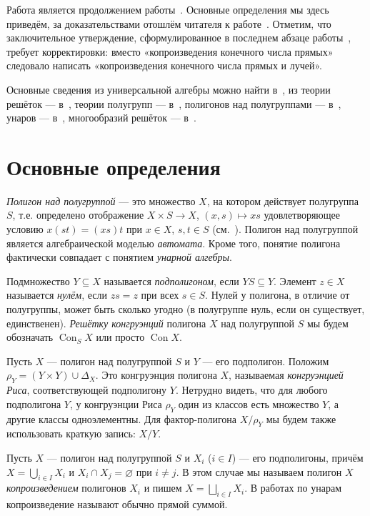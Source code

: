 \documentclass[11pt,twoside,final
]{article}
\def\Con{\operatorname{Con}}
\begin{document}
Работа является продолжением работы~\cite{Kozhukhov_8}.
Основные определения мы здесь приведём, за доказательствами отошлём читателя к работе~\cite{Kozhukhov_8}.
Отметим, что заключительное утверждение, сформулированное в последнем абзаце работы~\cite{Kozhukhov_8}, требует корректировки: вместо «копроизведения конечного числа прямых» следовало написать «копроизведения конечного числа прямых и лучей».

Основные сведения из универсальной алгебры можно найти в~\cite{Kohn_9}, из теории решёток — в~\cite{Gretzer_10}, теории полугрупп — в~\cite{Clifford_11}, полигонов над полугруппами — в~\cite{Kilp_1}, унаров — в~\cite{Jakubikova_12}, многообразий решёток — в~\cite{Jipsen_13}.


\section{Основные определения}

\textit{Полигон над полугруппой} — это множество $X$, на котором действует полугруппа $S$, т.е. определено отображение $X \times S \to X$, $(x,s) \mapsto xs$ удовлетворяющее условию $x(st) = (xs)t$ при $x \in X$, $s,t \in S$ (см.~\cite{Kilp_1}).
Полигон над полугруппой является алгебраической моделью \textit{автомата}.
Кроме того, понятие полигона фактически совпадает с понятием \textit{унарной алгебры}.

Подмножество $Y \subseteq X$ называется \textit{подполигоном}, если $YS \subseteq Y$.
Элемент $z \in X$ называется \textit{нулём}, если $zs = z$ при всех $s \in S$.
Нулей у полигона, в отличие от полугруппы, может быть сколько угодно (в полугруппе нуль, если он существует, единственен).
\textit{Решётку конгруэнций} полигона $X$ над полугруппой $S$ мы будем обозначать $\Con_S X$ или просто $\Con X$.

Пусть $X$ — полигон над полугруппой $S$ и $Y$ — его подполигон.
Положим $ \rho_Y = (Y \times Y) \cup \Delta_X $.
Это конгруэнция полигона $X$, называемая \textit{конгруэнцией Риса}, соответствующей подполигону $Y$.
Нетрудно видеть, что для любого подполигона $Y$, у конгруэнции Риса $\rho_Y$ один из классов есть множество $Y$, а другие классы одноэлементны.
Для фактор-полигона $X/\rho_Y$ мы будем также использовать краткую запись: $X/Y$.

Пусть $X$ — полигон над полугруппой $S$ и $X_i$ ($i \in I$) — его подполигоны, причём $X = \bigcup_{i \in I} X_{i}$ и $X_{i} \cap X_{j} = \varnothing$ при $i \neq j$.
В этом случае мы называем полигон $X$ \textit{копроизведением} полигонов $X_i$ и пишем $X = \bigsqcup_{i \in I} X_{i}$.
В работах по унарам копроизведение называют обычно прямой суммой.
\end{document}
